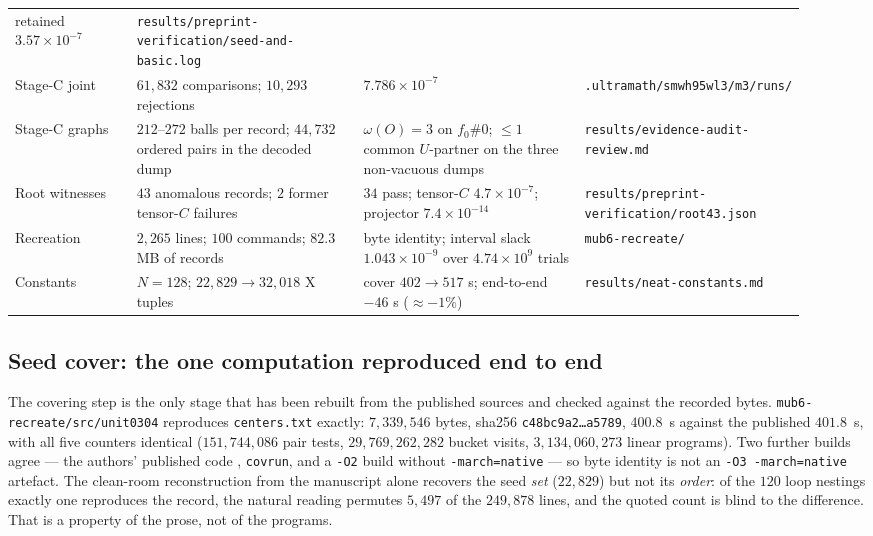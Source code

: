 \documentclass[10pt]{article}
\theoremstyle{definition}
\newcommand{\file}[1]{\texttt{\small #1}}
\begin{document}
\begin{center}
\begin{longtable}{@{}L{0.16\linewidth}L{0.30\linewidth}L{0.30\linewidth}L{0.16\linewidth}@{}}
retained $3.57\times10^{-7}$ & \file{results/\allowbreak{}preprint-\allowbreak{}verification/\allowbreak{}seed-\allowbreak{}and-\allowbreak{}basic.log} \\
Stage-C joint & $61{,}832$ comparisons; $10{,}293$ rejections & $7.786\times10^{-7}$ &
\file{.ultramath/\allowbreak{}smwh95wl3/\allowbreak{}m3/\allowbreak{}runs/\allowbreak{}} \\
Stage-C graphs & $212$--$272$ balls per record; $44{,}732$ ordered pairs in the decoded dump &
$\omega(O)=3$ on $f_0\#0$; $\le1$ common $U$-partner on the three non-vacuous dumps &
\file{results/\allowbreak{}evidence-\allowbreak{}audit-\allowbreak{}review.md} \\
Root witnesses & $43$ anomalous records; $2$ former tensor-$C$ failures & $34$ pass; tensor-$C$
$4.7\times10^{-7}$; projector $7.4\times10^{-14}$ & \file{results/\allowbreak{}preprint-\allowbreak{}verification/\allowbreak{}root43.json} \\
Recreation & $2{,}265$ lines; $100$ commands; $82.3$ MB of records & byte identity; interval slack
$1.043\times10^{-9}$ over $4.74\times10^{9}$ trials & \file{mub6-\allowbreak{}recreate/\allowbreak{}} \\
Constants & $N=128$; $22{,}829\to32{,}018$ X tuples & cover $402\to517$ s; end-to-end $-46$ s
($\approx-1\%$) & \file{results/\allowbreak{}neat-\allowbreak{}constants.md} \\
\bottomrule
\end{longtable}
\end{center}

\subsection{Seed cover: the one computation reproduced end to end}\label{sec:seedcover}
The covering step is the only stage that has been rebuilt from the published sources and checked
against the recorded bytes. \file{mub6-\allowbreak{}recreate/\allowbreak{}src/\allowbreak{}unit0304} reproduces \file{centers.txt} exactly:
$7{,}339{,}546$ bytes, sha256 \texttt{c48bc9a2\ldots a5789}, $400.8$~s against the published
$401.8$~s, with all five counters identical ($151{,}744{,}086$ pair tests, $29{,}769{,}262{,}282$
bucket visits, $3{,}134{,}060{,}273$ linear programs). Two further builds agree --- the authors' published code \cite{upstream},
\file{covrun}, and a \texttt{-O2} build without \texttt{-march=native} --- so byte identity is not an
\texttt{-O3 -march=native} artefact. The clean-room reconstruction from the manuscript alone recovers
the seed \emph{set} ($22{,}829$) but not its \emph{order}: of the $120$ loop nestings exactly one
reproduces the record, the natural reading permutes $5{,}497$ of the $249{,}878$ lines, and the
quoted count is blind to the difference. That is a property of the prose, not of the programs.
\end{document}
